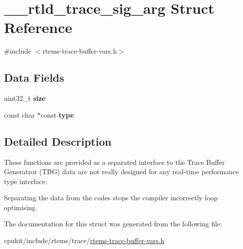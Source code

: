 \hypertarget{struct____rtld__trace__sig__arg}{}\section{\+\_\+\+\_\+rtld\+\_\+trace\+\_\+sig\+\_\+arg Struct Reference}
\label{struct____rtld__trace__sig__arg}


{\ttfamily \#include $<$rtems-\/trace-\/buffer-\/vars.\+h$>$}

\subsection*{Data Fields}
\begin{DoxyCompactItemize}
\item 
\mbox{\label{struct____rtld__trace__sig__arg_ae46c0b992b1fde1d28ac862df83de8ce}} 
uint32\+\_\+t {\bfseries size}
\item 
\mbox{\label{struct____rtld__trace__sig__arg_a13aa2619b1716c0bcd95bf961eb1438e}} 
const char $\ast$const {\bfseries type}
\end{DoxyCompactItemize}


\subsection{Detailed Description}
These functions are provided as a separated interface to the Trace Buffer Generatror (T\+BG) data are not really designed for any real-\/time performance type interface.

Separating the data from the codes stops the compiler incorrectly loop optimising. 

The documentation for this struct was generated from the following file\+:\begin{DoxyCompactItemize}
\item 
cpukit/include/rtems/trace/\mbox{\hyperlink{rtems-trace-buffer-vars_8h}{rtems-\/trace-\/buffer-\/vars.\+h}}\end{DoxyCompactItemize}
